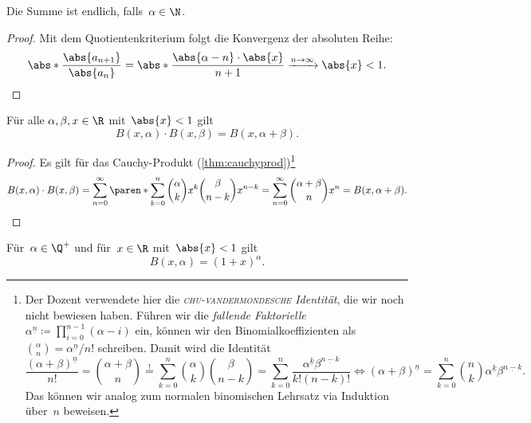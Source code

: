 \documentclass[a4paper]{article}
\begin{document}
Die Summe ist endlich, falls~$\alpha \in \N$.

\begin{proof}
    Mit dem Quotientenkriterium folgt die Konvergenz der absoluten Reihe:
    \begin{equation*}
        \abs*{\frac{\abs{a_{n+1}}}{\abs{a_n}}} = \abs*{\frac{\abs{\alpha-n} \cdot \abs{x}}{n+1}} \xrightarrow{n\to\infty} \abs{x} < 1. \qedhere
    \end{equation*}
\end{proof}

\begin{lemma}
    Für alle $\alpha,\beta,x \in \R$ mit~$\abs{x} < 1$ gilt
    \begin{equation*}
        B(x,\alpha) \cdot B(x,\beta) = B(x,\alpha+\beta).
    \end{equation*}
\end{lemma}

\begin{proof}
    Es gilt für das Cauchy-Produkt (\cref{thm:cauchyprod})\footnote{Der Dozent verwendete hier die \emph{\textsc{chu}-\textsc{vandermondesche} Identität}, die wir noch nicht bewiesen haben. Führen wir die \emph{fallende Faktorielle} $\alpha^{\underline{n}} \coloneqq \prod_{i=0}^{n-1} (\alpha-i)$ ein, können wir den Binomialkoeffizienten als $\binom{\alpha}{n} = \alpha^{\underline{n}}/n!$ schreiben. Damit wird die Identität
        \begin{equation*}
            \frac{(\alpha+\beta)^{\underline{n}}}{n!}= \binom{\alpha+\beta}{n} \overset{!}{=} \sum_{k=0}^n \binom{\alpha}{k}\binom{\beta}{n-k} = \sum_{k=0}^n \frac{\alpha^{\underline{k}} \beta^{\underline{n-k}}}{k!(n-k)!} \iff (\alpha+\beta)^{\underline{n}} = \sum_{k=0}^n \binom{n}{k} \alpha^{\underline{k}} \beta^{\underline{n-k}}.
        \end{equation*}
        Das können wir analog zum normalen binomischen Lehrsatz via Induktion über~$n$ beweisen.}
    \begin{equation*}
        B(x,\alpha) \cdot B(x,\beta) = \sum_{n=0}^\infty \paren*{\sum_{k=0}^n \binom{\alpha}{k} x^k \binom{\beta}{n-k} x^{n-k}} = \sum_{n=0}^\infty \binom{\alpha+\beta}{n} x^n = B(x,\alpha+\beta). \qedhere
    \end{equation*}
\end{proof}

\begin{theorem}
    Für~$\alpha \in \Q^+$ und für~$x \in \R$ mit~$\abs{x} < 1$ gilt
    \begin{equation*}
        B(x,\alpha) = (1+x)^\alpha.
    \end{equation*}
\end{theorem}
\end{document}
